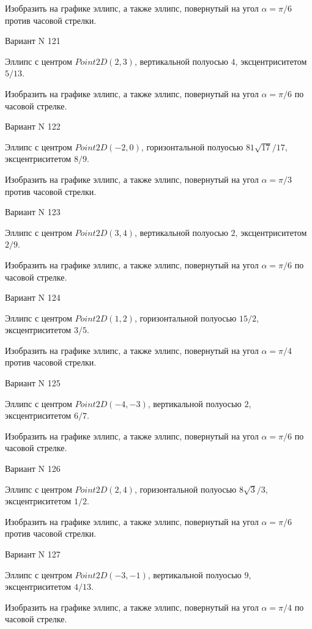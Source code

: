 \documentclass[11pt]{report}
\begin{document}
    Изобразить на графике эллипс, а также эллипс, повернутый на угол $\alpha = $$\pi / 6$ против часовой стрелки.

Вариант N 121

Эллипс с центром $Point2D\left(2, 3\right)$, вертикальной полуосью $4$, эксцентриситетом $5 / 13$.

    Изобразить на графике эллипс, а также эллипс, повернутый на угол $\alpha = $$\pi / 6$ по часовой стрелке.

Вариант N 122

Эллипс с центром $Point2D\left(-2, 0\right)$, горизонтальной полуосью $81 \sqrt{17} / 17$, эксцентриситетом $8 / 9$.

    Изобразить на графике эллипс, а также эллипс, повернутый на угол $\alpha = $$\pi / 3$ против часовой стрелки.

Вариант N 123

Эллипс с центром $Point2D\left(3, 4\right)$, вертикальной полуосью $2$, эксцентриситетом $2 / 9$.

    Изобразить на графике эллипс, а также эллипс, повернутый на угол $\alpha = $$\pi / 6$ по часовой стрелке.

Вариант N 124

Эллипс с центром $Point2D\left(1, 2\right)$, горизонтальной полуосью $15 / 2$, эксцентриситетом $3 / 5$.

    Изобразить на графике эллипс, а также эллипс, повернутый на угол $\alpha = $$\pi / 4$ против часовой стрелки.

Вариант N 125

Эллипс с центром $Point2D\left(-4, -3\right)$, вертикальной полуосью $2$, эксцентриситетом $6 / 7$.

    Изобразить на графике эллипс, а также эллипс, повернутый на угол $\alpha = $$\pi / 6$ по часовой стрелке.

Вариант N 126

Эллипс с центром $Point2D\left(2, 4\right)$, горизонтальной полуосью $8 \sqrt{3} / 3$, эксцентриситетом $1 / 2$.

    Изобразить на графике эллипс, а также эллипс, повернутый на угол $\alpha = $$\pi / 6$ против часовой стрелки.

Вариант N 127

Эллипс с центром $Point2D\left(-3, -1\right)$, вертикальной полуосью $9$, эксцентриситетом $4 / 13$.

    Изобразить на графике эллипс, а также эллипс, повернутый на угол $\alpha = $$\pi / 4$ по часовой стрелке.
\end{document}
